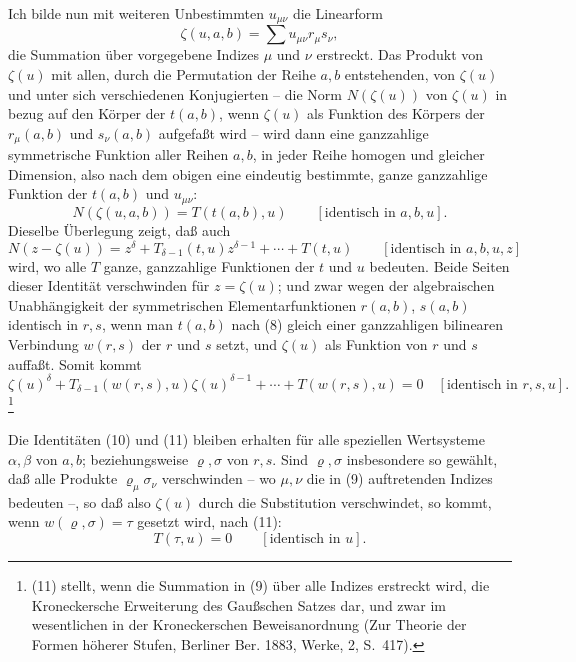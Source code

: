 \documentclass[11pt]{article}
\begin{document}
Ich bilde nun mit weiteren Unbestimmten $u_{\mu\nu}$ die Linearform
\begin{equation}
 \zeta(u,a,b)=\sum u_{\mu\nu}r_\mu s_\nu,
\tag{9}
\end{equation}
die Summation über vorgegebene Indizes $\mu$ und $\nu$ erstreckt. Das Produkt von $\zeta(u)$ mit allen, durch die Permutation der Reihe $a,b$ entstehenden, von $\zeta(u)$ und unter sich verschiedenen Konjugierten -- die Norm $N(\zeta(u))$ von $\zeta(u)$ in bezug auf den Körper der $t(a,b)$, wenn $\zeta(u)$ als Funktion des Körpers der $r_\mu(a,b)$ und $s_\nu(a,b)$ aufgefaßt wird -- wird dann eine ganzzahlige symmetrische Funktion aller Reihen $a,b$, in jeder Reihe homogen und gleicher Dimension, also nach dem obigen eine eindeutig bestimmte, ganze ganzzahlige Funktion der $t(a,b)$ und $u_{\mu\nu}$:
\begin{equation}
 N(\zeta(u,a,b))=T(t(a,b),u)\qquad[\text{identisch in }a,b,u].
\tag{10}
\end{equation}
Dieselbe Überlegung zeigt, daß auch
\[
N(z-\zeta(u))=z^\delta+T_{\delta-1}(t,u)z^{\delta-1}+\cdots+T(t,u)
\qquad[\text{identisch in }a,b,u,z]
\]
wird, wo alle $T$ ganze, ganzzahlige Funktionen der $t$ und $u$ bedeuten. Beide Seiten dieser Identität verschwinden für $z=\zeta(u)$; und zwar wegen der algebraischen Unabhängigkeit der symmetrischen Elementarfunktionen $r(a,b)$, $s(a,b)$ identisch in $r,s$, wenn man $t(a,b)$ nach (8) gleich einer ganzzahligen bilinearen Verbindung $w(r,s)$ der $r$ und $s$ setzt, und $\zeta(u)$ als Funktion von $r$ und $s$ auffaßt. Somit kommt
\begin{equation}
\zeta(u)^\delta+T_{\delta-1}(w(r,s),u)\zeta(u)^{\delta-1}+\cdots+T(w(r,s),u)=0
\quad[\text{identisch in }r,s,u].
\tag{11}
\end{equation}\footnote{(11) stellt, wenn die Summation in (9) über alle Indizes erstreckt wird, die Kroneckersche Erweiterung des Gaußschen Satzes dar, und zwar im wesentlichen in der Kroneckerschen Beweisanordnung (Zur Theorie der Formen höherer Stufen, Berliner Ber. 1883, Werke, 2, S.~417).}

Die Identitäten (10) und (11) bleiben erhalten für alle speziellen Wertsysteme $\alpha,\beta$ von $a,b$; beziehungsweise $\varrho,\sigma$ von $r,s$. Sind $\varrho,\sigma$ insbesondere so gewählt, daß alle Produkte $\varrho_\mu\sigma_\nu$ verschwinden -- wo $\mu,\nu$ die in (9) auftretenden Indizes bedeuten --, so daß also $\zeta(u)$ durch die Substitution verschwindet, so kommt, wenn $w(\varrho,\sigma)=\tau$ gesetzt wird, nach (11):
\begin{equation}
 T(\tau,u)=0\qquad[\text{identisch in }u].
\tag{12}
\end{equation}
\end{document}
